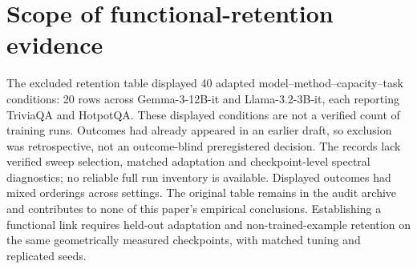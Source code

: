 \documentclass{article}
\begin{document}
\section{Scope of functional-retention evidence}
\label{app:retention}
The excluded retention table displayed 40 adapted model--method--capacity--task conditions: 20 rows across Gemma-3-12B-it and Llama-3.2-3B-it, each reporting TriviaQA and HotpotQA. These displayed conditions are not a verified count of training runs. Outcomes had already appeared in an earlier draft, so exclusion was retrospective, not an outcome-blind preregistered decision. The records lack verified sweep selection, matched adaptation and checkpoint-level spectral diagnostics; no reliable full run inventory is available. Displayed outcomes had mixed orderings across settings. The original table remains in the audit archive and contributes to none of this paper's empirical conclusions. Establishing a functional link requires held-out adaptation and non-trained-example retention on the same geometrically measured checkpoints, with matched tuning and replicated seeds.
\end{document}
